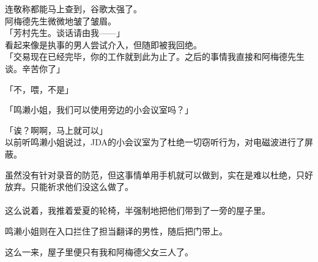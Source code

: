 连敬称都能马上查到，谷歌太强了。\\

阿梅德先生微微地皱了皱眉。\\

「芳村先生。谈话请由我——」\\

看起来像是执事的男人尝试介入，但随即被我回绝。\\

「交易现在已经完毕，你的工作就到此为止了。之后的事情我直接和阿梅德先生谈。辛苦你了」

「不，喂，不是」

「鸣濑小姐，我们可以使用旁边的小会议室吗？」

「诶？啊啊，马上就可以」\\

以前听鸣濑小姐说过，JDA的小会议室为了杜绝一切窃听行为，对电磁波进行了屏蔽。

虽然没有针对录音的防范，但这事情单用手机就可以做到，实在是难以杜绝，只好放弃。只能祈求他们没这么做了。\\

\\

这么说着，我推着爱夏的轮椅，半强制地把他们带到了一旁的屋子里。

鸣濑小姐则在入口拦住了担当翻译的男性，随后把门带上。

这么一来，屋子里便只有我和阿梅德父女三人了。\\

